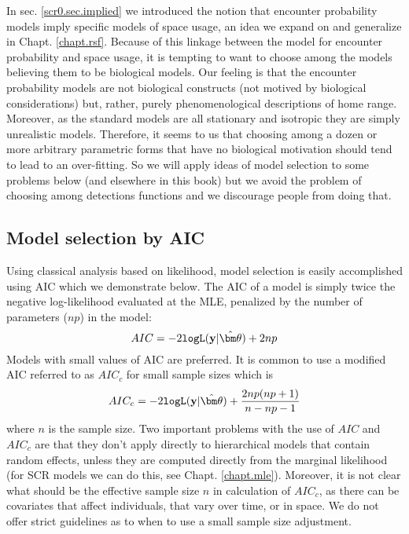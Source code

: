 {} In
sec. \ref{scr0.sec.implied} we introduced the notion that encounter
probability models imply specific models of space usage, an idea we
expand on and generalize in Chapt. \ref{chapt.rsf}. Because of this
linkage between the model for encounter probability and space usage,
it is tempting to want to choose among the models believing them to be
biological models.  Our feeling is that the encounter probability
models are not biological constructs (not motived by biological
considerations) but, rather, purely phenomenological descriptions of
home range. Moreover, as the standard models are all stationary and
isotropic they are simply unrealistic models. Therefore, it seems to
us that choosing among a dozen or more arbitrary parametric forms that
have no biological motivation should tend to lead to an over-fitting.
So we will apply ideas of model selection to some problems below (and
elsewhere in this book) but we avoid the problem of choosing among
detections functions and we discourage people from doing that.  




\subsection{Model selection by AIC}
\label{gof.sec.aic}

Using classical analysis based on likelihood, model selection
 is easily accomplished using AIC \citep{burnham_anderson:2002}
which we demonstrate below. The AIC of a model is simply twice the
negative log-likelihood evaluated at the MLE,  penalized by the number of parameters
($np$) in the model:
\[
 AIC = -2 \mbox{\tt logL}({\bf y}|\hat{\bm \theta})  + 2 np
\]
Models with small values of AIC are preferred.
It is common to use a modified AIC referred to as $AIC_{c}$ for small
sample sizes which is
\[
 AIC_{c}  =
-2 \mbox{\tt logL}({\bf y}|\hat{\bm \theta})  + \frac{2 np
  (np+1)}{n-np-1}
\]
where $n$ is the sample size.  Two important problems with the use of
$AIC$ and $AIC_{c}$ are that they don't apply directly to hierarchical
models that contain random effects, unless they are computed directly
from the marginal likelihood (for SCR models we can do this, see
Chapt. \ref{chapt.mle}). Moreover, it is not clear what should be the
effective sample size $n$ in calculation of $AIC_{c}$, as there can be
covariates that affect individuals, that vary over time, or in space.
We do not offer strict guidelines as to when to use a small sample
size adjustment.

